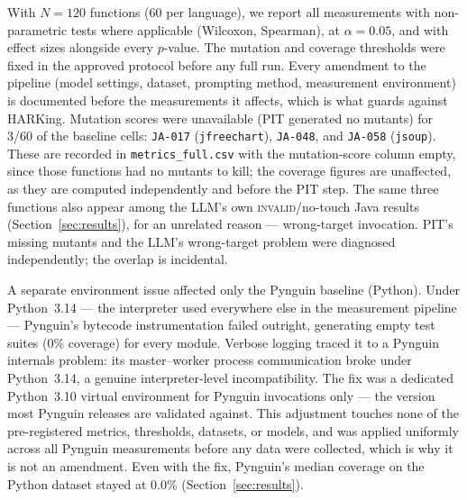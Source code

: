 With $N=120$ functions (60 per language), we report all measurements with non-parametric
tests where applicable (Wilcoxon, Spearman), at $\alpha=0.05$, and with effect sizes
alongside every $p$-value. The mutation and coverage thresholds were fixed in the approved
protocol before any full run. Every amendment to the pipeline (model settings, dataset,
prompting method, measurement environment) is documented before the measurements it
affects, which is what guards against HARKing. Mutation scores were unavailable (PIT
generated no mutants) for 3/60 of the baseline cells: \texttt{JA-017} (\texttt{jfreechart}),
\texttt{JA-048}, and \texttt{JA-058} (\texttt{jsoup}). These are recorded in
\texttt{metrics\_full.csv} with the mutation-score column empty, since those functions had
no mutants to kill; the coverage figures are unaffected, as they are computed independently
and before the PIT step. The same three functions also appear among the LLM's own
\textsc{invalid}/no-touch Java results (Section~\ref{sec:results}), for an unrelated
reason --- wrong-target invocation. PIT's missing mutants and the LLM's wrong-target
problem were diagnosed independently; the overlap is incidental.

A separate environment issue affected only the Pynguin baseline (Python). Under
Python~3.14 --- the interpreter used everywhere else in the measurement pipeline ---
Pynguin's bytecode instrumentation failed outright, generating empty test suites (0\%
coverage) for every module. Verbose logging traced it to a Pynguin internals problem: its
master--worker process communication broke under Python~3.14, a genuine interpreter-level
incompatibility. The fix was a dedicated Python~3.10 virtual environment for Pynguin
invocations only --- the version most Pynguin releases are validated against. This
adjustment touches none of the pre-registered metrics, thresholds, datasets, or models,
and was applied uniformly across all Pynguin measurements before any data were collected,
which is why it is not an amendment. Even with the fix, Pynguin's median coverage on the
Python dataset stayed at 0.0\% (Section~\ref{sec:results}).

